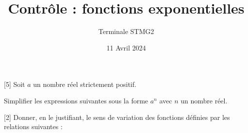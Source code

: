 \documentclass{exam}
\title{Contrôle : fonctions exponentielles}
\date{11 Avril 2024}
\author{Terminale STMG2}
\begin{document}
\maketitle
{}
\begin{questions}
\vspace*{0.2cm}
[5]
Soit $a$ un nombre réel strictement positif. 

Simplifier les expressions suivantes sous la forme $a^n$ avec $n$ un nombre réel.
\vspace*{0.5cm}
[2]
Donner, en le justifiant, le sens de variation des fonctions définies par les relations suivantes :
\end{questions}
\end{document}
